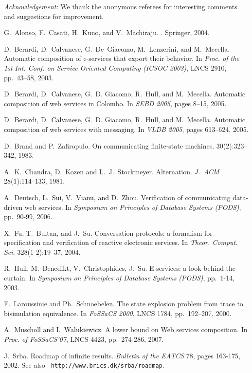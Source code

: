 \documentclass{LMCS}
\theoremstyle{plain}\newtheorem{remark}{Remark}
\theoremstyle{plain}\newtheorem{lemma}[thm]{Lemma}
\begin{document}
\medskip

\emph{Acknowledgement:} We thank the anonymous referees  for interesting
comments and suggestions for improvement.




\begin{thebibliography}{1}

G.~Alonso, F.~Casati, H.~Kuno, and V.~Machiraju.
.
\newblock Springer, 2004.

D.~Berardi, D.~Calvanese, G.~De~Giacomo, M.~Lenzerini, and M.~Mecella.
\newblock Automatic composition of e-services that export their behavior.
\newblock In {\em Proc. of the 1st Int. Conf. on Service Oriented Computing
  (ICSOC 2003)}, LNCS 2910, pp.~43--58, 2003.

D.~Berardi, D.~Calvanese, G.~D. Giacomo, R.~Hull, and M.~Mecella.
\newblock Automatic composition of web services in Colombo.
\newblock In {\em SEBD 2005}, pages 8--15, 2005.

D.~Berardi, D.~Calvanese, G.~D. Giacomo, R.~Hull, and M.~Mecella.
\newblock Automatic composition of web services with messaging.
\newblock In {\em VLDB 2005}, pages 613--624, 2005.

D.~Brand and P.~Zafiropulo.
\newblock On communicating finite-state machines.
 30(2):323--342, 1983.

A.~K.~Chandra, D.~Kozen and L.~J.~Stockmeyer.
\newblock Alternation. 
\newblock \emph{J.\ ACM} 28(1):114--133, 1981.

A.~Deutsch, L.~Sui, V.~Vianu, and D.~Zhou.
\newblock Verification of communicating data-driven web services.
\newblock In {\em Symposium on Principles of Database Systems (PODS)},
pp.~90-99, 2006.

X.~Fu, T.~Bultan, and J.~Su.
\newblock Conversation protocols: a formalism for specification and 
verification of reactive electronic services. 
\newblock In \emph{Theor. Comput. Sci.} 328(1-2):19--37, 2004.

R.~Hull, M.~Benedikt, V.~Christophides, J.~Su.
\newblock E-services: a look behind the curtain. 
\newblock In \emph{Symposium on Principles of Database Systems
    (PODS)}, pp.~1-14, 2003.

F.~Laroussinie and {\relax Ph}.~Schnoebelen.
\newblock The state explosion problem from trace to bisimulation equivalence.
\newblock In {\em FoSSaCS 2000}, LNCS 1784, pp.~192--207, 2000.

A.~Muscholl and I.~Walukiewicz. 
\newblock A lower bound on Web services composition.
\newblock In \emph{Proc. of FoSSaCS'07}, LNCS 4423, pp.~274-286, 2007.

J.~Srba.
\newblock Roadmap of infinite results.
\newblock \emph{Bulletin of the EATCS} 78, pages 163-175, 2002. See
also \texttt{ http://www.brics.dk/srba/roadmap}.



\end{thebibliography}
\end{document}
